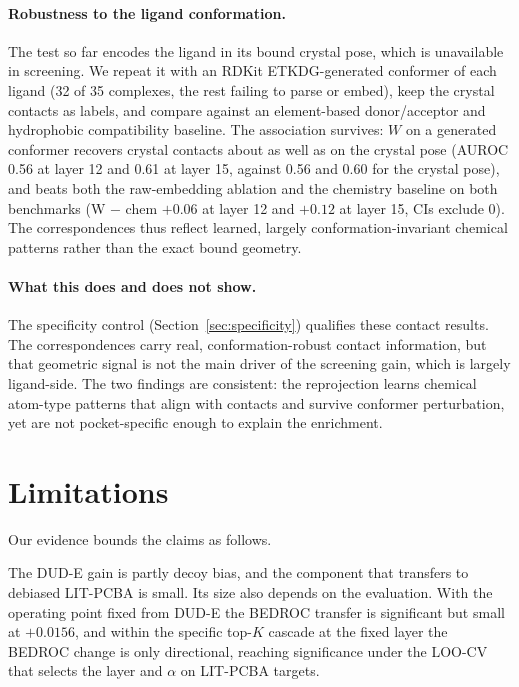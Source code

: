\documentclass[10pt,letterpaper,twocolumn]{article}
\begin{document}
\paragraph{Robustness to the ligand conformation.} The test so far encodes the ligand in its bound crystal pose, which is unavailable in screening. We repeat it with an RDKit ETKDG-generated conformer of each ligand (32 of 35 complexes, the rest failing to parse or embed), keep the crystal contacts as labels, and compare against an element-based donor/acceptor and hydrophobic compatibility baseline. The association survives: $W$ on a generated conformer recovers crystal contacts about as well as on the crystal pose (AUROC 0.56 at layer 12 and 0.61 at layer 15, against 0.56 and 0.60 for the crystal pose), and beats both the raw-embedding ablation and the chemistry baseline on both benchmarks (W $-$ chem $+0.06$ at layer 12 and $+0.12$ at layer 15, CIs exclude 0). The correspondences thus reflect learned, largely conformation-invariant chemical patterns rather than the exact bound geometry.

\paragraph{What this does and does not show.} The specificity control (Section~\ref{sec:specificity}) qualifies these contact results. The correspondences carry real, conformation-robust contact information, but that geometric signal is not the main driver of the screening gain, which is largely ligand-side. The two findings are consistent: the reprojection learns chemical atom-type patterns that align with contacts and survive conformer perturbation, yet are not pocket-specific enough to explain the enrichment.

\section{Limitations}

Our evidence bounds the claims as follows.

The DUD-E gain is partly decoy bias, and the component that transfers to debiased LIT-PCBA is small. Its size also depends on the evaluation. With the operating point fixed from DUD-E the BEDROC transfer is significant but small at $+0.0156$, and within the specific top-$K$ cascade at the fixed layer the BEDROC change is only directional, reaching significance under the LOO-CV that selects the layer and $\alpha$ on LIT-PCBA targets.
\end{document}
